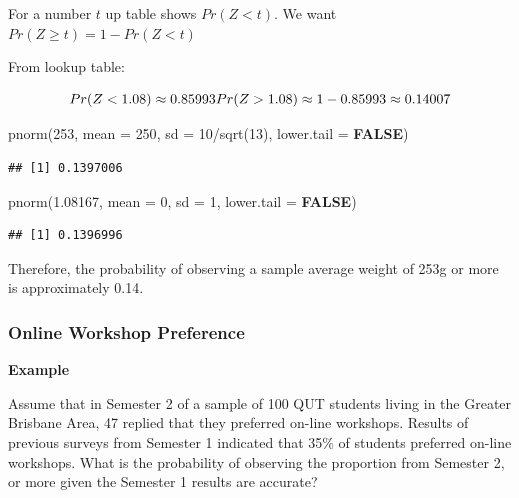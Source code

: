 \documentclass[
]{article}
\newenvironment{Shaded}{\begin{snugshade}}{\end{snugshade}}
\newcommand{\AttributeTok}[1]{\textcolor[rgb]{0.80,0.80,0.80}{#1}}
\newcommand{\ConstantTok}[1]{\textcolor[rgb]{0.86,0.64,0.64}{\textbf{#1}}}
\newcommand{\DecValTok}[1]{\textcolor[rgb]{0.86,0.86,0.80}{#1}}
\newcommand{\FloatTok}[1]{\textcolor[rgb]{0.75,0.75,0.82}{#1}}
\newcommand{\FunctionTok}[1]{\textcolor[rgb]{0.94,0.94,0.56}{#1}}
\newcommand{\NormalTok}[1]{\textcolor[rgb]{0.80,0.80,0.80}{#1}}
\newcommand{\SpecialCharTok}[1]{\textcolor[rgb]{0.86,0.64,0.64}{#1}}
\begin{document}
For a number \(t\) up table shows \(Pr(Z < t)\). We want
\(Pr(Z \geq t) = 1 - Pr(Z < t)\)

From lookup table:

\[
Pr(Z < 1.08) \approx 0.85993\\
Pr(Z > 1.08) \approx 1 - 0.85993\approx0.14007
\]

\begin{Shaded}
\begin{Highlighting}[]
\FunctionTok{pnorm}\NormalTok{(}\DecValTok{253}\NormalTok{, }\AttributeTok{mean =} \DecValTok{250}\NormalTok{, }\AttributeTok{sd =} \DecValTok{10}\SpecialCharTok{/}\FunctionTok{sqrt}\NormalTok{(}\DecValTok{13}\NormalTok{), }\AttributeTok{lower.tail =} \ConstantTok{FALSE}\NormalTok{)}
\end{Highlighting}
\end{Shaded}

\begin{verbatim}
## [1] 0.1397006
\end{verbatim}

\begin{Shaded}
\begin{Highlighting}[]
\FunctionTok{pnorm}\NormalTok{(}\FloatTok{1.08167}\NormalTok{, }\AttributeTok{mean =} \DecValTok{0}\NormalTok{, }\AttributeTok{sd =} \DecValTok{1}\NormalTok{, }\AttributeTok{lower.tail =} \ConstantTok{FALSE}\NormalTok{)}
\end{Highlighting}
\end{Shaded}

\begin{verbatim}
## [1] 0.1396996
\end{verbatim}

Therefore, the probability of observing a sample average weight of 253g
or more is approximately 0.14.

\hypertarget{online-workshop-preference}{%
\subsubsection{Online Workshop
Preference}\label{online-workshop-preference}}

\textbf{Example}

Assume that in Semester 2 of a sample of 100 QUT students living in the
Greater Brisbane Area, 47 replied that they preferred on-line workshops.
Results of previous surveys from Semester 1 indicated that 35\% of
students preferred on-line workshops. What is the probability of
observing the proportion from Semester 2, or more given the Semester 1
results are accurate?
\end{document}
